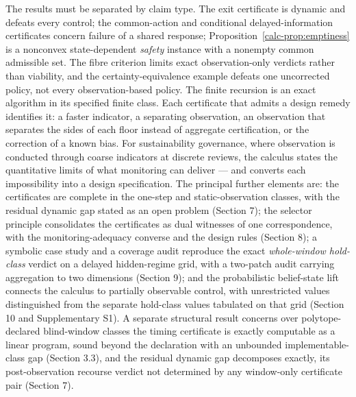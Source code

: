 \documentclass[10pt,twocolumn]{article}
\theoremstyle{definition}
\begin{document}
The results must be separated by claim type. The exit certificate is
dynamic and defeats every control; the common-action and conditional
delayed-information certificates concern failure of a shared response;
Proposition~\ref{calc-prop:emptiness} is a nonconvex state-dependent
\emph{safety} instance with a nonempty common admissible set. The fibre
criterion limits exact observation-only verdicts rather than viability,
and the certainty-equivalence example defeats one uncorrected policy,
not every observation-based policy. The finite recursion is an exact
algorithm in its specified finite class. Each certificate that admits a design
remedy identifies it: a faster indicator, a separating observation, an
observation that separates the sides of each floor instead of aggregate
certification, or the correction of a known bias. For sustainability
governance, where observation is conducted through coarse indicators at
discrete reviews, the calculus states the quantitative limits of what
monitoring can deliver --- and converts each impossibility into a design
specification. The principal further elements are: the certificates are complete in the one-step and static-observation classes, with the residual dynamic gap stated as an open problem (Section 7); the selector principle consolidates the certificates as dual witnesses of one correspondence, with the monitoring-adequacy converse and the design rules (Section 8); a symbolic case study and a coverage audit reproduce the exact \emph{whole-window hold-class} verdict on a delayed hidden-regime grid, with a two-patch audit carrying aggregation to two dimensions (Section 9); and the probabilistic belief-state lift connects the calculus to partially observable control, with unrestricted values distinguished from the separate hold-class values tabulated on that grid (Section 10 and Supplementary S1). A separate structural result concerns over polytope-declared
blind-window classes the timing certificate is exactly computable as a linear
program, sound beyond the declaration with an unbounded implementable-class gap
(Section 3.3), and the residual dynamic gap decomposes exactly, its
post-observation recourse verdict not determined by any window-only certificate
pair (Section 7).
\end{document}
